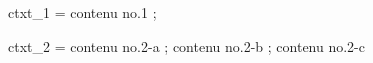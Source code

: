 ctxt_1 = contenu no.1 ;

ctxt_2 = contenu no.2-a ;
         contenu no.2-b ;
         contenu no.2-c

